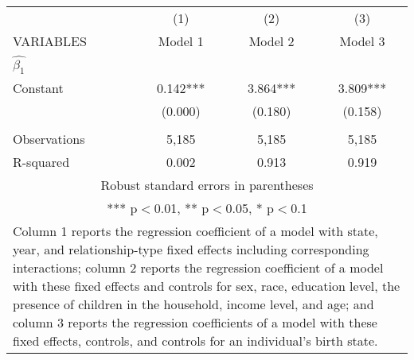 \begin{tabular}{lccc}
\hline
 & (1) & (2) & (3) \\
VARIABLES & Model 1 & Model 2 & Model 3 \\ \hline
 $\hat{\beta_1}$ &  &  &  \\
Constant & 0.142*** & 3.864*** & 3.809*** \\
 & (0.000) & (0.180) & (0.158) \\
 &  &  &  \\
Observations & 5,185 & 5,185 & 5,185 \\
 R-squared & 0.002 & 0.913 & 0.919 \\ \hline
\multicolumn{4}{c}{ Robust standard errors in parentheses} \\
\multicolumn{4}{c}{ *** p$<$0.01, ** p$<$0.05, * p$<$0.1} \\
\multicolumn{4}{p{0.6\linewidth}}{\footnotesize Column 1 reports the regression coefficient of a model with state, year, and relationship-type fixed effects including corresponding interactions; column 2 reports the regression coefficient of a model with these fixed effects and controls for sex, race, education level, the presence of children in the household, income level, and age; and column 3 reports the regression coefficients of a model with these fixed effects, controls, and controls for an individual’s birth state.} \\
\end{tabular}
